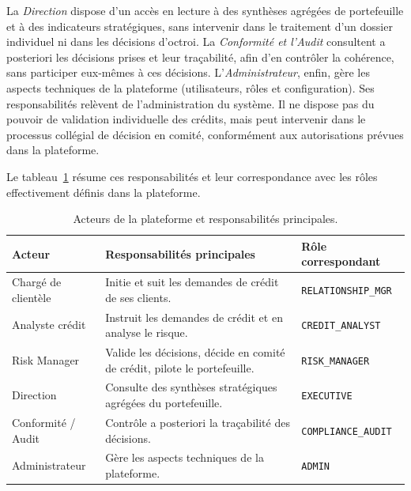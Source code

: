 La \emph{Direction} dispose d'un accès en lecture à des synthèses agrégées de portefeuille et à des indicateurs stratégiques, sans intervenir dans le traitement d'un dossier individuel ni dans les décisions d'octroi. La \emph{Conformité et l'Audit} consultent a posteriori les décisions prises et leur traçabilité, afin d'en contrôler la cohérence, sans participer eux-mêmes à ces décisions. L'\emph{Administrateur}, enfin, gère les aspects techniques de la plateforme (utilisateurs, rôles et configuration). Ses responsabilités relèvent de l'administration du système. Il ne dispose pas du pouvoir de validation individuelle des crédits, mais peut intervenir dans le processus collégial de décision en comité, conformément aux autorisations prévues dans la plateforme.

Le tableau~\ref{tab:acteurs-roles} résume ces responsabilités et leur correspondance avec les rôles effectivement définis dans la plateforme.

\begin{table}[htbp]
    \centering
    \footnotesize
    \caption{Acteurs de la plateforme et responsabilités principales.}
    \label{tab:acteurs-roles}
    \begin{tabular}{p{3.2cm}p{7cm}p{3.5cm}}
        \toprule
        \textbf{Acteur} & \textbf{Responsabilités principales} & \textbf{Rôle correspondant} \\
        \midrule
        Chargé de clientèle & Initie et suit les demandes de crédit de ses clients. & \texttt{RELATIONSHIP\_MGR} \\
        \addlinespace
        Analyste crédit & Instruit les demandes de crédit et en analyse le risque. & \texttt{CREDIT\_ANALYST} \\
        \addlinespace
        Risk Manager & Valide les décisions, décide en comité de crédit, pilote le portefeuille. & \texttt{RISK\_MANAGER} \\
        \addlinespace
        Direction & Consulte des synthèses stratégiques agrégées du portefeuille. & \texttt{EXECUTIVE} \\
        \addlinespace
        Conformité / Audit & Contrôle a posteriori la traçabilité des décisions. & \texttt{COMPLIANCE\_AUDIT} \\
        \addlinespace
        Administrateur & Gère les aspects techniques de la plateforme. & \texttt{ADMIN} \\
        \bottomrule
    \end{tabular}
\end{table}

